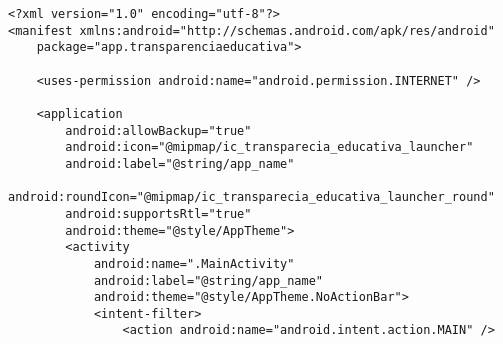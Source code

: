 \documentclass[12pt,a4paper]{article}
\begin{document}
\begin{lstlisting}[caption=./mobile/src/main/AndroidManifest.xml]
<?xml version="1.0" encoding="utf-8"?>
<manifest xmlns:android="http://schemas.android.com/apk/res/android"
    package="app.transparenciaeducativa">

    <uses-permission android:name="android.permission.INTERNET" />

    <application
        android:allowBackup="true"
        android:icon="@mipmap/ic_transparecia_educativa_launcher"
        android:label="@string/app_name"
        android:roundIcon="@mipmap/ic_transparecia_educativa_launcher_round"
        android:supportsRtl="true"
        android:theme="@style/AppTheme">
        <activity
            android:name=".MainActivity"
            android:label="@string/app_name"
            android:theme="@style/AppTheme.NoActionBar">
            <intent-filter>
                <action android:name="android.intent.action.MAIN" />


\end{lstlisting}
\end{document}
